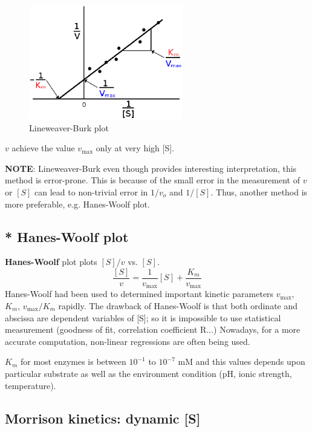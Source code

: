 \begin{figure}[hbt]
 \centerline{\includegraphics[height=5cm]{./images/Lineweaver-Burk_plot.eps}}
\caption{Lineweaver-Burk plot}
\label{fig:lineweaver-burk}
\end{figure}
$v$ achieve the value $v_\max$ only at very high [S].

{\bf NOTE}: Lineweaver-Burk even though provides interesting
interpretation, this method is error-prone. This is because of the
small error in the measurement of $v$ or $[S]$ can lead to
non-trivial error in $1/v_o$ and $1/[S]$. Thus, another method is more
preferable, e.g. Hanes-Woolf plot.


\subsection{* Hanes-Woolf plot}
\label{sec:Hanes-Woolf-plot}

{\bf Hanes-Woolf} plot plots
$[S]/v$ vs. $[S]$.
\begin{equation}
  \label{eq:324}
  \frac{[S]}{v} = \frac{1}{v_\max}[S] + \frac{K_m}{v_\max}
\end{equation}
Hanes-Woolf had been used to determined important kinetic parameters
$v_\max$, $K_m$, $v_\max/K_m$ rapidly. The drawback of Hanes-Woolf
is that both ordinate and abscissa are dependent variables of [S]; so
it is impossible to use statistical measurement (goodness of fit,
correlation coefficient R...) Nowadays, for a more accurate
computation, non-linear regressions are often being used.

$K_m$ for most enzymes is between $10^{-1}$ to $10^{-7}$ mM and
this values depends upon particular substrate as well as the
environment condition (pH, ionic strength, temperature). 

\subsection{Morrison kinetics: dynamic [S]}
\label{sec:morrison-kinetics}

